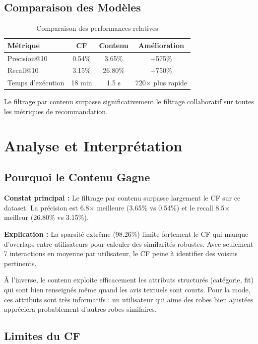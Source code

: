 \documentclass[12pt,a4paper]{article}
\begin{document}
\subsection{Comparaison des Modèles}

\begin{table}[H]
\centering
\begin{tabular}{lccc}
\toprule
\textbf{Métrique} & \textbf{CF} & \textbf{Contenu} & \textbf{Amélioration} \\
\midrule
Precision@10 & 0.54\% & 3.65\% & +575\% \\
Recall@10 & 3.15\% & 26.80\% & +750\% \\
Temps d'exécution & 18 min & 1.5 s & 720$\times$ plus rapide \\
\bottomrule
\end{tabular}
\caption{Comparaison des performances relatives}
\end{table}

Le filtrage par contenu surpasse significativement le filtrage collaboratif sur toutes les métriques de recommandation.

\section{Analyse et Interprétation}

\subsection{Pourquoi le Contenu Gagne}

\textbf{Constat principal :} Le filtrage par contenu surpasse largement le CF sur ce dataset. La précision est 6.8$\times$ meilleure (3.65\% vs 0.54\%) et le recall 8.5$\times$ meilleur (26.80\% vs 3.15\%).

\textbf{Explication :} La sparsité extrême (98.26\%) limite fortement le CF qui manque d'overlaps entre utilisateurs pour calculer des similarités robustes. Avec seulement 7 interactions en moyenne par utilisateur, le CF peine à identifier des voisins pertinents.

À l'inverse, le contenu exploite efficacement les attributs structurés (catégorie, fit) qui sont bien renseignés même quand les avis textuels sont courts. Pour la mode, ces attributs sont très informatifs : un utilisateur qui aime des robes bien ajustées appréciera probablement d'autres robes similaires.

\subsection{Limites du CF}
\end{document}
